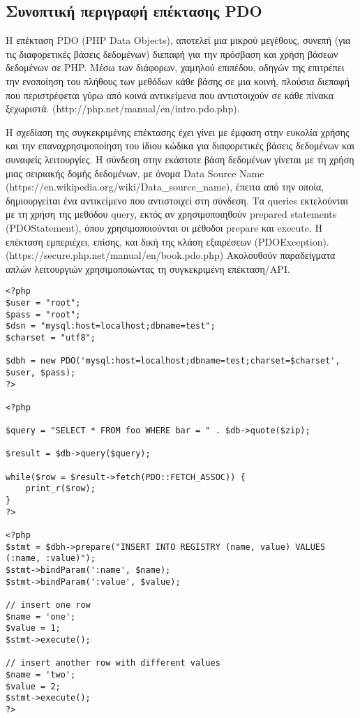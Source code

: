 \documentclass[diploma]{softlab-thesis}
\begin{document}
\subsection{Συνοπτική περιγραφή επέκτασης PDO}

Η επέκταση PDO (PHP Data Objects), αποτελεί μια μικρού μεγέθους, συνεπή (για
τις διαφορετικές βάσεις δεδομένων) διεπαφή για την πρόσβαση και χρήση βάσεων
δεδομένων σε PHP. Μέσω των διάφορων, χαμηλού επιπέδου, οδηγών της επιτρέπει την
ενοποίηση του πλήθους των μεθόδων κάθε βάσης σε μια κοινή, πλούσια διεπαφή που
περιστρέφεται γύρω από κοινά αντικείμενα που αντιστοιχούν σε κάθε πίνακα ξεχωριστά.
(http://php.net/manual/en/intro.pdo.php). 

\bigskip

Η σχεδίαση της συγκεκριμένης επέκτασης έχει γίνει με έμφαση στην ευκολία χρήσης
και την επαναχρησιμοποίηση του ίδιου κώδικα για διαφορετικές βάσεις δεδομένων
και συναφείς λειτουργίες. Η σύνδεση στην εκάστοτε βάση δεδομένων γίνεται με τη
χρήση μιας σειριακής δομής δεδομένων, με όνομα Data Source Name
(https://en.wikipedia.org/wiki/Data\_source\_name), έπειτα από την οποία,
δημιουργείται ένα αντικείμενο που αντιστοιχεί στη σύνδεση.  Τα queries
εκτελούνται με τη χρήση της μεθόδου query, εκτός αν χρησιμοποιηθούν prepared
statements (PDOStatement), όπου χρησιμοποιούνται οι μέθοδοι prepare και
execute. Η επέκταση εμπεριέχει, επίσης, και δική της κλάση εξαιρέσεων
(PDOException). (https://secure.php.net/manual/en/book.pdo.php) Ακολουθούν
παραδείγματα απλών λειτουργιών χρησιμοποιώντας τη συγκεκριμένη επέκταση/API.


\begin{lstlisting}
<?php
$user = "root";
$pass = "root";
$dsn = "mysql:host=localhost;dbname=test";
$charset = "utf8";

$dbh = new PDO('mysql:host=localhost;dbname=test;charset=$charset', $user, $pass);
?>

<?php

$query = "SELECT * FROM foo WHERE bar = " . $db->quote($zip);

$result = $db->query($query);

while($row = $result->fetch(PDO::FETCH_ASSOC)) {
    print_r($row);
}
?>

<?php
$stmt = $dbh->prepare("INSERT INTO REGISTRY (name, value) VALUES (:name, :value)");
$stmt->bindParam(':name', $name);
$stmt->bindParam(':value', $value);

// insert one row
$name = 'one';
$value = 1;
$stmt->execute();

// insert another row with different values
$name = 'two';
$value = 2;
$stmt->execute();
?>
\end{lstlisting}
\end{document}
